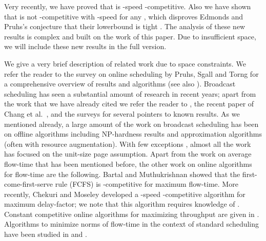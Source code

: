\documentclass[11pt]{article}
\newcommand{\etal}{et al.\ }
\newcommand{\spone}{-3.5mm}
\begin{document}
\begin{titlepage}
\iffalse
 In this paper we assume, for simplicity, the discrete unit-time slot model.  In this model, all requests arrive at
integer times; the algorithm and adversary make scheduling decisions at the beginning of each time slot. Each page take
unit-time to transmit; hence a request  that is satisfied by a transmission of  in time slot  has a finish
time .  For the most part, we assume for simplicity of exposition, that the algorithm is given an integer speed
 which implies that the algorithm schedules (at most)  requests in each time slot. We indicate, where necessary,
how the analysis extends to non-integer speeds. See \cite{EdmondsP04} for more discussion on discrete time versus
continuous time models. \fi

 Very recently, we
have proved that  is -speed -competitive. 
Also we have shown that  is
not -competitive with -speed for any , 
which disproves Edmonds and Pruhs's conjecture that 
their lowerbound 
is tight \cite{EdmondsP04}.
The analysis of these new results is complex and
built on the work of this paper. 
Due to insufficient space, we will
include these new results in the full version. 

\medskip
{} We give a very brief description of
related work due to space constraints. We refer the reader to the
survey on online scheduling by Pruhs, Sgall and Torng \cite{PruhsST}
for a comprehensive overview of results and algorithms (see also
\cite{Pruhs07}).  Broadcast scheduling has seen a substantial amount
of research in recent years; apart from the work that we have already
cited we refer the reader to
\cite{KalyanasundaramPV00,CharikarK06,KhullerK04}, the recent paper of
Chang \etal \cite{ChangEGK08}, and the surveys \cite{PruhsST,Pruhs07}
for several pointers to known results.  As we mentioned already, a
large amount of the work on broadcast scheduling has been on offline
algorithms including NP-hardness results and approximation algorithms
(often with resource augmentation). With few exceptions
\cite{EdmondsP03}, almost all the work has focused on the unit-size
page assumption. Apart from the work on average flow-time that has
been mentioned before, the other work on online algorithms for
flow-time are the following. Bartal and Muthukrishnan
\cite{BartalM00,ChangEGK08} showed that the first-come-first-serve
rule (FCFS) is -competitive for maximum flow-time. More recently,
Chekuri and Moseley \cite{ChekuriM09} developed a -speed
-competitive algorithm for maximum delay-factor; we note
that this algorithm requires knowledge of . Constant
competitive online algorithms for maximizing throughput are given in
\cite{Kimc04,ChanLTW04,ZhengFCCPW06,ChrobakDJKK06}. Algorithms to
minimize  norms of flow-time in the context of standard
scheduling have been studied in \cite{BansalP03} and
\cite{ChekuriGKK04}. \vspace{\spone}


\end{titlepage}
\end{document}
